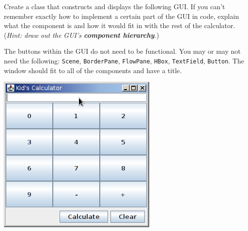 Create a class that constructs and displays the following GUI. If you can't remember exactly how to implement a certain part of the GUI in code, explain what the component is and how it would fit in with the rest of the calculator. (\textit{Hint: draw out the GUI's \textbf{component hierarchy}.})\\
\begin{minipage}{0.5\textwidth}
\vspace{-54pt}
The buttons within the GUI do not need to be functional.  You may or may not need the following: \texttt{Scene}, \texttt{BorderPane}, \texttt{FlowPane}, \texttt{HBox}, \texttt{TextField}, \texttt{Button}. The window should fit to all of the components and have a title.
\end{minipage}
\hspace{50px}
\begin{minipage}{0.3\textwidth}
\vspace{6pt}
\includegraphics[scale=0.6]{other/calculator.png}
\end{minipage} \hfill

